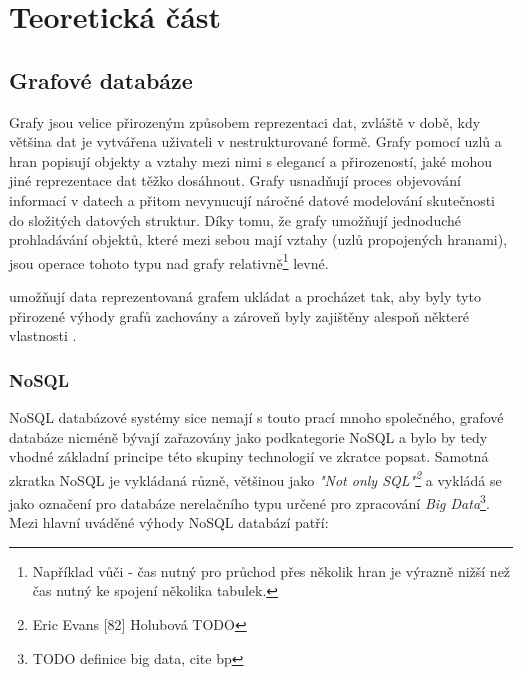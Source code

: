 \chapter{Teoretická část}

\section{Grafové databáze}

Grafy jsou velice přirozeným způsobem reprezentaci dat, zvláště v době, kdy většina dat je vytvářena uživateli v nestrukturované formě. Grafy pomocí uzlů a hran popisují objekty a vztahy mezi nimi s elegancí a přirozeností, jaké mohou jiné reprezentace dat těžko dosáhnout. Grafy usnadňují proces objevování informací v datech a přitom nevynucují náročné datové modelování skutečnosti do složitých datových struktur. Díky tomu, že grafy umožňují jednoduché prohladávání objektů, které mezi sebou mají vztahy (uzlů propojených hranami), jsou operace tohoto typu nad grafy relativně\footnote{Například vůči  - čas nutný pro průchod přes několik hran je výrazně nižší než čas nutný ke spojení několika tabulek.} levné. 

 umožňují data reprezentovaná grafem ukládat a procházet tak, aby byly tyto přirozené výhody grafů zachovány a zároveň byly zajištěny alespoň některé vlastnosti . 

\subsection{NoSQL}
NoSQL databázové systémy sice nemají s touto prací mnoho společného, grafové databáze nicméně bývají zařazovány jako podkategorie NoSQL a bylo by tedy vhodné základní principe této skupiny technologií ve zkratce popsat. Samotná zkratka NoSQL je vykládaná různě, většinou jako \textit{"Not only SQL"\footnote{Eric Evans [82] Holubová TODO}} a vykládá se jako označení pro databáze nerelačního typu určené pro zpracování \textit{Big Data}\footnote{TODO definice big data, cite bp}. Mezi hlavní uváděné výhody NoSQL databází patří: 

